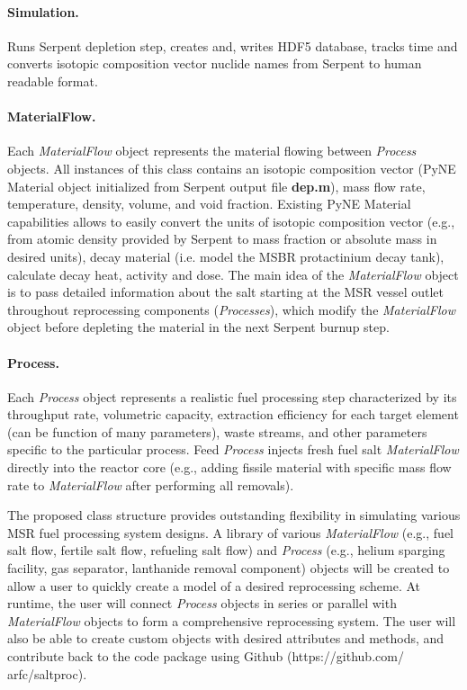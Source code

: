 \documentclass[12pt]{article} %
\begin{document}
	\paragraph{Simulation.} Runs Serpent depletion step, 
	creates and, writes HDF5 database, tracks time and converts 
	isotopic composition vector nuclide names from Serpent to human 
	readable format.
	
	\paragraph{MaterialFlow.}Each \textit{MaterialFlow} object 
	represents the material flowing between \textit{Process} objects. 
	All instances of this class contains an isotopic composition vector 
	(PyNE Material object initialized from Serpent output file 
	\textbf{dep.m}), mass flow rate, 
	temperature, density, volume, and void fraction. Existing PyNE Material 
	capabilities allows to easily convert the units of isotopic 
	composition vector (e.g., from atomic density provided by Serpent to 
	mass fraction or absolute mass in desired units), decay material 
	(i.e. model the \gls{MSBR} protactinium decay tank), calculate 
	decay heat, activity and dose. The main idea of the \textit{MaterialFlow} 
	object is to pass detailed information about the salt starting at the 
	\gls{MSR} vessel outlet throughout reprocessing components 
	(\textit{Processes}), which modify the \textit{MaterialFlow} 
	object before depleting the material in the next Serpent burnup step.
		
	\paragraph{Process.}Each \textit{Process} object represents a 
	realistic fuel processing step characterized by its throughput rate, 
	volumetric capacity, extraction efficiency for each target element (can be 
	function of many parameters), waste streams, and other parameters specific 
	to the particular process. Feed	\textit{Process} injects fresh fuel salt 
	\textit{MaterialFlow} directly into the reactor core (e.g., adding fissile 
	material with specific mass flow rate to \textit{MaterialFlow} after 
	performing all removals).

The proposed class structure provides outstanding flexibility in simulating 
various \gls{MSR} fuel processing system designs. A library of various 
\textit{MaterialFlow} (e.g., 
fuel salt flow, fertile salt flow, refueling salt flow) and \textit{Process} 
(e.g., helium sparging facility, gas separator, lanthanide removal component) 
objects will be created to allow a user to quickly create a model 
of a desired reprocessing scheme. At runtime, the user will connect 
\textit{Process} objects in series or parallel with \textit{MaterialFlow} 
objects to form a comprehensive reprocessing system. The user will also be 
able to create custom objects with desired attributes and methods, and 
contribute back to the code package using Github (https://github.com/ arfc/saltproc).	
\end{document}
